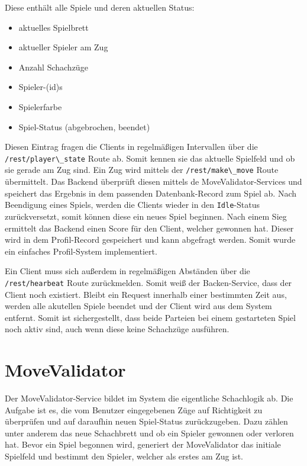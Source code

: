 Diese enthält alle Spiele und deren aktuellen Status:

\begin{itemize}
\tightlist
\item
  aktuelles Spielbrett
\item
  aktueller Spieler am Zug
\item
  Anzahl Schachzüge
\item
  Spieler-(id)s
\item
  Spielerfarbe
\item
  Spiel-Status (abgebrochen, beendet)
\end{itemize}

Diesen Eintrag fragen die Clients in regelmäßigen Intervallen über die
\passthrough{\lstinline!/rest/player\_state!} Route ab. Somit kennen sie
das aktuelle Spielfeld und ob sie gerade am Zug sind. Ein Zug wird
mittels der \passthrough{\lstinline!/rest/make\_move!} Route
übermittelt. Das Backend überprüft diesen mittels de
MoveValidator-Services und speichert das Ergebnis in dem passenden
Datenbank-Record zum Spiel ab. Nach Beendigung eines Spiels, werden die
Clients wieder in den \passthrough{\lstinline!Idle!}-Status
zurückversetzt, somit können diese ein neues Spiel beginnen. Nach einem
Sieg ermittelt das Backend einen Score für den Client, welcher gewonnen
hat. Dieser wird in dem Profil-Record gespeichert und kann abgefragt
werden. Somit wurde ein einfaches Profil-System implementiert.

Ein Client muss sich außerdem in regelmäßigen Abständen über die
\passthrough{\lstinline!/rest/hearbeat!} Route zurückmelden. Somit weiß
der Backen-Service, dass der Client noch existiert. Bleibt ein Request
innerhalb einer bestimmten Zeit aus, werden alle akutellen Spiele
beendet und der Client wird aus dem System entfernt. Somit ist
sichergestellt, dass beide Parteien bei einem gestarteten Spiel noch
aktiv sind, auch wenn diese keine Schachzüge ausführen.

\hypertarget{movevalidator}{%
\section{MoveValidator}\label{movevalidator}}

Der MoveValidator-Service bildet im System die eigentliche Schachlogik
ab. Die Aufgabe ist es, die vom Benutzer eingegebenen Züge auf
Richtigkeit zu überprüfen und auf daraufhin neuen Spiel-Status
zurückzugeben. Dazu zählen unter anderem das neue Schachbrett und ob ein
Spieler gewonnen oder verloren hat. Bevor ein Spiel begonnen wird,
generiert der MoveValidator das initiale Spielfeld und bestimmt den
Spieler, welcher als erstes am Zug ist.

